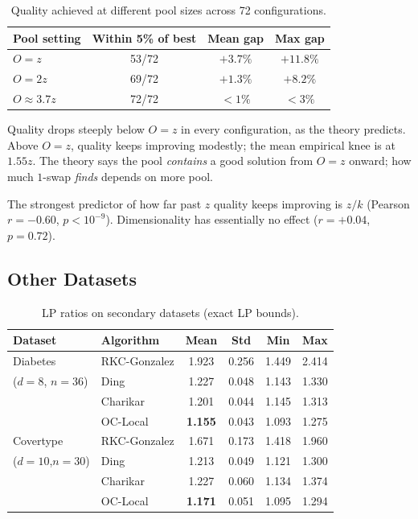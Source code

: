 \documentclass[11pt]{article}
\begin{document}
\begin{table}[H]
\centering
\begin{tabular}{lccc}
\toprule
Pool setting & Within 5\% of best & Mean gap & Max gap \\
\midrule
$O = z$      & 53/72 & $+3.7\%$ & $+11.8\%$ \\
$O = 2z$     & 69/72 & $+1.3\%$ & $+8.2\%$ \\
$O \approx 3.7z$ & 72/72 & ${<}1\%$  & ${<}3\%$ \\
\bottomrule
\end{tabular}
\caption{Quality achieved at different pool sizes across 72 configurations.}
\end{table}

Quality drops steeply below $O = z$ in every configuration, as the theory predicts. Above $O = z$, quality keeps improving modestly; the mean empirical knee is at $1.55z$. The theory says the pool \emph{contains} a good solution from $O = z$ onward; how much $1$-swap \emph{finds} depends on more pool.

The strongest predictor of how far past $z$ quality keeps improving is $z/k$ (Pearson $r = -0.60$, $p < 10^{-9}$). Dimensionality has essentially no effect ($r = +0.04$, $p = 0.72$).

\subsection{Other Datasets}

\begin{table}[H]
\centering
\begin{tabular}{llcccc}
\toprule
Dataset & Algorithm & Mean & Std & Min & Max \\
\midrule
Diabetes       & RKC-Gonzalez & 1.923 & 0.256 & 1.449 & 2.414 \\
($d=8$, $n=36$)& Ding         & 1.227 & 0.048 & 1.143 & 1.330 \\
               & Charikar     & 1.201 & 0.044 & 1.145 & 1.313 \\
               & OC-Local     & \textbf{1.155} & 0.043 & 1.093 & 1.275 \\
\midrule
Covertype      & RKC-Gonzalez & 1.671 & 0.173 & 1.418 & 1.960 \\
($d=10$,$n=30$)& Ding         & 1.213 & 0.049 & 1.121 & 1.300 \\
               & Charikar     & 1.227 & 0.060 & 1.134 & 1.374 \\
               & OC-Local     & \textbf{1.171} & 0.051 & 1.095 & 1.294 \\
\bottomrule
\end{tabular}
\caption{LP ratios on secondary datasets (exact LP bounds).}
\end{table}
\end{document}
